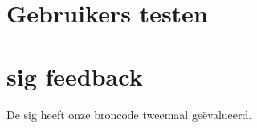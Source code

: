 \section{Gebruikers testen}

\section{\acs{sig} feedback}
De \acf{sig} heeft onze broncode tweemaal geëvalueerd.